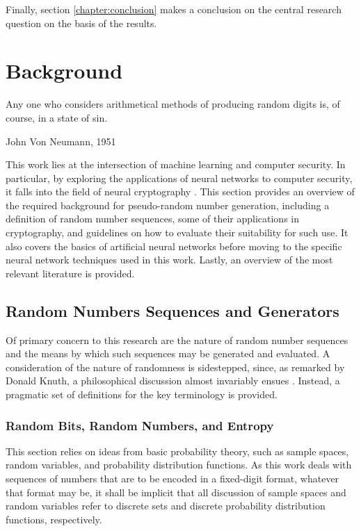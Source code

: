 \documentclass[12pt, titlepage]{report}
\theoremstyle{definition}
\begin{document}
Finally, section \ref{chapter:conclusion} makes a conclusion on the central research question on the basis of the results.




\chapter{Background}\label{chapter:background}
\epigraph{Any one who considers arithmetical methods of producing random digits is, of course, in a state of sin.}{John Von Neumann, 1951}

This work lies at the intersection of machine learning and computer security. In particular, by exploring the applications of neural networks to computer security, it falls into the field of neural cryptography \cite{klimov2002analysis}. This section provides an overview of the required background for pseudo-random number generation, including a definition of random number sequences, some of their applications in cryptography, and guidelines on how to evaluate their suitability for such use. It also covers the basics of artificial neural networks before moving to the specific neural network techniques used in this work. Lastly, an overview of the most relevant literature is provided.

\section{Random Numbers Sequences and Generators}
Of primary concern to this research are the nature of random number sequences and the means by which such sequences may be generated and evaluated. A consideration of the nature of randomness is sidestepped, since, as remarked by Donald Knuth, a philosophical discussion almost invariably ensues \cite[p. 2]{donald1998art}. Instead, a pragmatic set of definitions for the key terminology is provided.

\subsection{Random Bits, Random Numbers, and Entropy}
This section relies on ideas from basic probability theory, such as sample spaces, random variables, and probability distribution functions. As this work deals with sequences of numbers that are to be encoded in a fixed-digit format, whatever that format may be, it shall be implicit that all discussion of sample spaces and random variables refer to discrete sets and discrete probability distribution functions, respectively.
\end{document}
